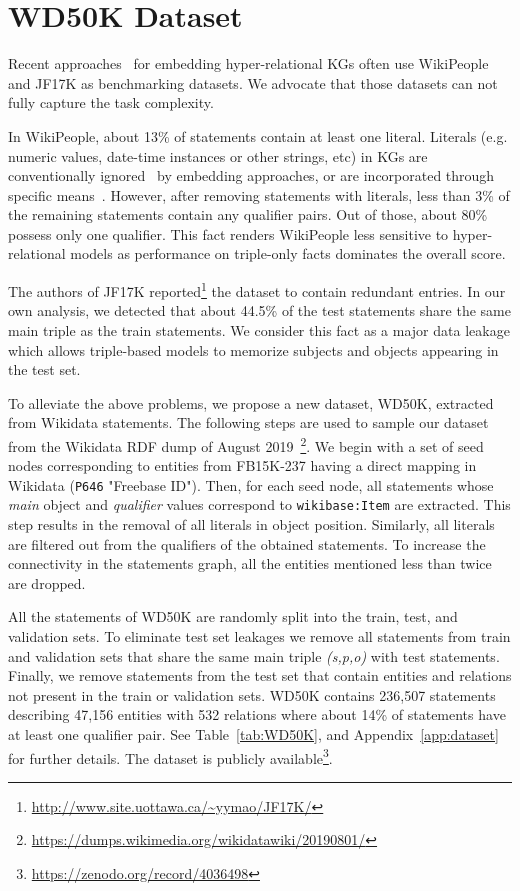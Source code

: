 \documentclass[11pt,a4paper]{article}
\begin{document}
\section{WD50K Dataset}
\label{sec:WD50K}
Recent approaches~\citep{DBLP:conf/www/GuanJWC19, 10.1145/3366423.3380188, 10.1145/3366423.3380257} for embedding hyper-relational KGs often use WikiPeople and JF17K as benchmarking datasets. 
We advocate that those datasets can not fully capture the task complexity.

In WikiPeople, about 13\% of statements contain at least one literal. Literals (e.g. numeric values, date-time instances or other strings, etc) in KGs are conventionally ignored~\citep{10.1145/3366423.3380257} by embedding approaches, or are incorporated through specific means~\citep{DBLP:conf/semweb/KristiadiKL0F19}. However, after removing statements with literals, less than 3\% of the remaining statements contain any qualifier pairs. Out of those, about 80\% possess only one qualifier. This fact renders WikiPeople less sensitive to hyper-relational models as performance on triple-only facts dominates the overall score.


The authors of JF17K reported\footnote{ \url{http://www.site.uottawa.ca/~yymao/JF17K/}} the dataset to contain redundant entries. In our own analysis, we detected that about 44.5\% of the test statements share the same main  triple as the train statements.
We consider this fact as a major data leakage which allows triple-based models to memorize subjects and objects appearing in the test set.
 
To alleviate the above problems, we propose a new dataset, WD50K, extracted from Wikidata statements. 
The following steps are used to sample our dataset from the Wikidata RDF dump of August 2019~\footnote{\url{https://dumps.wikimedia.org/wikidatawiki/20190801/}}. 
We begin with a set of seed nodes corresponding to entities from FB15K-237 having a direct mapping in Wikidata (\texttt{P646} "Freebase ID"). 
Then, for each seed node, all statements whose \textit{main} object and \textit{qualifier} values correspond to \texttt{wikibase:Item} are extracted. 
This step results in the removal of all literals in object position. 
Similarly, all literals are filtered out from the qualifiers of the obtained statements.
To increase the connectivity in the statements graph, all the entities mentioned less than twice are dropped. 


All the statements of WD50K are randomly split into the train, test, and validation sets. 
To eliminate test set leakages we remove all statements from train and validation sets that share the same main triple \emph{(s,p,o)} with test statements. 
Finally, we remove statements from the test set that contain entities and relations not present in the train or validation sets. 
WD50K contains 236,507 statements describing 47,156 entities with 532 relations where about 14\% of statements have at least one qualifier pair.
See Table~\ref{tab:WD50K}, and Appendix~\ref{app:dataset} for further details. The dataset is publicly available\footnote{\url{https://zenodo.org/record/4036498}}.
\end{document}
